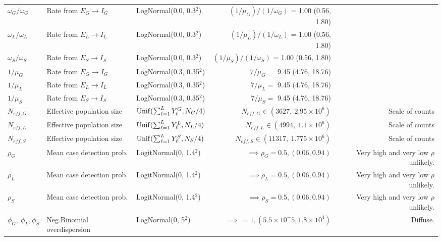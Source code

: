 \begin{table}
\begin{fullpage}
\begin{tabular}{lllrr}
			$ \omega_G/\omega_G $ & Rate from $ E_G\rightarrow I_G $ & LogNormal(0.0, 0.3$ ^2 $) & $ (1/\mu_G)\big/(1/\omega_G) $ = 1.00 (0.56, 1.80) & \cite{chowell2014transmission,velasquez2015time,glynn2017variability} \\
			$ \omega_L/\omega_L $ & Rate from $ E_L\rightarrow I_L $ & LogNormal(0.0, 0.3$ ^2 $) & $ (1/\mu_L)\big/(1/\omega_L) $ = 1.00 (0.56, 1.80) & \cite{chowell2014transmission,velasquez2015time,glynn2017variability} \\
			$ \omega_S/\omega_S $ & Rate from $ E_S\rightarrow I_S $ & LogNormal(0.0, 0.3$ ^2 $) & $ (1/\mu_S)\big/(1/\omega_S) $ = 1.00 (0.56, 1.80) & \cite{chowell2014transmission,velasquez2015time,glynn2017variability} \\
			$ 1/\mu_G $ & Rate from $ E_G\rightarrow I_G $ &  LogNormal(0.3, 0.35$ ^2 $) & $ 7/\mu_G = $ 9.45 (4.76, 18.76) & \cite{chowell2014transmission,velasquez2015time,glynn2017variability} \\
			$ 1/\mu_L $ & Rate from $ E_L\rightarrow I_L $ &  LogNormal(0.3, 0.35$ ^2 $) & $ 7/\mu_L = $ 9.45 (4.76, 18.76) & \cite{chowell2014transmission,velasquez2015time,glynn2017variability} \\
			$ 1/\mu_S $ & Rate from $ E_S\rightarrow I_S $ &  LogNormal(0.3, 0.35$ ^2 $) & $ 7/\mu_S = $ 9.45 (4.76, 18.76) & \cite{chowell2014transmission,velasquez2015time,glynn2017variability} \\
			$ N_{eff,G} $ & Effective population size & $\mathrm{Unif}(\sum_{\ell=1}^{L}Y_\ell^G, N_G/4) $& $ N_{eff,G} \in (3627,\ 2.95\times10^6) $ & Scale of counts \\
			$ N_{eff,L} $ & Effective population size & $\mathrm{Unif}(\sum_{\ell=1}^{L}Y_\ell^L, N_L/4) $& $ N_{eff,L} \in (4994,\ 1.1\times10^6) $ & Scale of counts \\
			$ N_{eff,S} $ & Effective population size & $\mathrm{Unif}(\sum_{\ell=1}^{L}Y_\ell^S, N_S/4) $& $ N_{eff,S} \in (11317,\ 1.775\times10^6) $ & Scale of counts \\
			$ \rho_G $ &  Mean case detection prob. & LogitNormal(0, 1.4$ ^2 $) & $ \implies \rho_G = 0.5, (0.06, 0.94)$ & Very high and very low $ \rho $ unlikely. \\
			$ \rho_L $ &  Mean case detection prob. & LogitNormal(0, 1.4$ ^2 $) & $ \implies \rho_L = 0.5, (0.06, 0.94)$ & Very high and very low $ \rho $ unlikely. \\
			$ \rho_S $ & Mean case detection prob. & LogitNormal(0, 1.4$ ^2 $) & $ \implies \rho_S = 0.5, (0.06, 0.94)$ & Very high and very low $ \rho $ unlikely. \\
			$ \phi_G,\ \phi_L, \phi_S $ &  Neg.Binomial overdispersion & LogNormal(0, 5$ ^2 $) & $ \implies \ = 1, (5.5\times 10^-5, 1.8\times10^4)$ & Diffuse. \\
			\hline
		\end{tabular}
	\end{fullpage}
\end{table}

